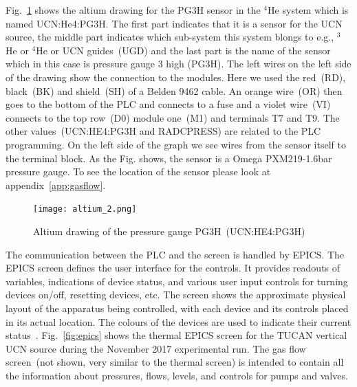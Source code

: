 Fig.~\ref{fig:altium} shows the altium drawing for the PG3H sensor in
the $^4$He system which is named UCN:He4:PG3H. The first part
indicates that it is a sensor for the UCN source, the middle part
indicates which sub-system this system blongs to e.g., $^3$He or
$^4$He or UCN guides~(UGD) and the last part is the name of the sensor
which in this case is pressure gauge 3 high (PG3H). The left wires on
the left side of the drawing show the connection to the modules. Here
we used the red~(RD), black~(BK) and shield~(SH) of a Belden 9462
cable. An orange wire~(OR) then goes to the bottom of the PLC and
connects to a fuse and a violet wire~(VI) connects to the top row~(D0)
module one~(M1) and terminals T7 and T9. The other
values~(UCN:HE4:PG3H and RADCPRESS) are related to the PLC
programming. On the left side of the graph we see wires from the
sensor itself to the terminal block. As the Fig. shows, the sensor is
a Omega PXM219-1.6bar pressure gauge. To see the location of the
sensor please look at appendix~\ref{app:gasflow}.

\begin{figure}[h!]
  \centering
  \texttt{[image: altium\_2.png]}
  \caption{Altium drawing of the pressure gauge PG3H~(UCN:HE4:PG3H) }
  \label{fig:altium}
\end{figure}



The communication between the PLC and the screen is handled by EPICS.
The EPICS screen defines the user interface for the controls. It
provides readouts of variables, indications of device status, and
various user input controls for turning devices on/off, resetting
devices, etc. The screen shows the approximate physical layout of the
apparatus being controlled, with each device and its controls placed
in its actual location. The colours of the devices are used to
indicate their current status~\cite{Sean_manual}. Fig.~\ref{fig:epics}
shows the thermal EPICS screen for the TUCAN vertical UCN source
during the November 2017 experimental run. The gas flow screen~(not
shown, very similar to the thermal screen) is intended to contain all
the information about pressures, flows, levels, and controls for pumps and
valves.

